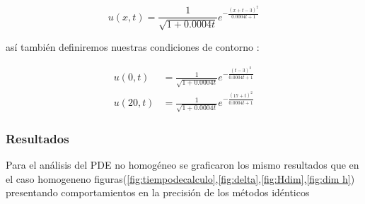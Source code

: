 \documentclass[11pt, spanish]{article}
\begin{document}
\begin{equation}
    u(x,t) =\frac{1}{\sqrt{1+0.0004 t}}e^{- \frac{(x+t-3)^2}{0.0004t+1}}
\end{equation}

as\'i tambi\'en definiremos nuestras condiciones de contorno : 

\begin{align}
    u(0,t) &=  \frac{1}{\sqrt{1+0.0004 t}}e^{- \frac{(t-3)^2}{0.0004t+1}} \\
    u(20,t) &= \frac{1}{\sqrt{1+0.0004 t}}e^{- \frac{(17+t)^2}{0.0004t+1}}
\end{align}

\subsubsection{Resultados }
Para el an\'alisis del PDE no homog\'eneo se graficaron los mismo resultados que en el caso homogeneno figuras(\ref{fig:tiempodecalculo},\ref{fig:delta},\ref{fig:Hdim},\ref{fig:dim h}) presentando comportamientos en la precisi\'on de los m\'etodos id\'enticos 
\end{document}
